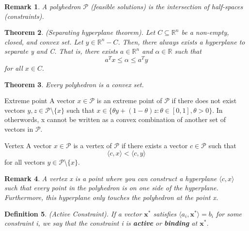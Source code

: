 \documentclass[twoside]{article}
\newcounter{lecnum}
\newtheorem{theorem}{Theorem}[lecnum]
\newtheorem{definition}[theorem]{Definition}
\newtheorem{remark}[theorem]{Remark}
\begin{document}
\begin{remark}A polyhedron $\mathcal{P}$ (feasible solutions) is the intersection of half-spaces (constraints).
\end{remark}

\begin{theorem}(Separating hyperplane theorem). Let $C \subseteq \mathbb{R}^n$ be a non-empty, closed, and convex set. Let $y \in \mathbb{R}^n - C$. Then, there always exists a hyperplane to separate y and C. That is, there exists $a \in \mathbb{R}^n$ and $\alpha \in \mathbb{R}$ such that 
$$
a^Tx \leq \alpha \leq a^Ty
$$
for all $x \in C.$
\end{theorem}

\begin{theorem}Every polyhedron is a convex set.
\end{theorem}

\begin{definition_exam}{Extreme point}{} A vector $x \in \mathcal{P}$ is an extreme point of $\mathcal{P}$ if there does not exist vectors $y, z \in \mathcal{P}$\textbackslash $\{x\}$ such that $x \in \{\theta y + (1-\theta)z: \theta \in [0,1], \theta > 0\}$. In otherwords, x cannot be written as a convex combination of another set of vectors in $\mathcal{P}$.
\end{definition_exam}

\begin{definition_exam}{Vertex}{} A vector $x \in \mathcal{P}$ is a vertex of $\mathcal{P}$ if there exists a vector $c \in \mathcal{P}$ such that 
$$
\langle c, x \rangle < \langle c, y \rangle
$$
for all vectors $y \in \mathcal{P}$\textbackslash $\{x\}$.
\end{definition_exam}

\begin{remark}A vertex x is a point where you can construct a hyperplane $\langle c, x \rangle$ such that every point in the polyhedron is on one side of the hyperplane. Furthermore, this hyperplane only touches the polyhedron at the point x.
\end{remark}

\begin{definition}(Active Constraint). If a vector $\textbf{x}^*$ satisfies $\langle a_i, \textbf{x}^* \rangle = b_i$ for some constraint i, we say that the constraint i is \textbf{active} or \textbf{binding} at $\textbf{x}^*$.
\end{definition}
\end{document}

